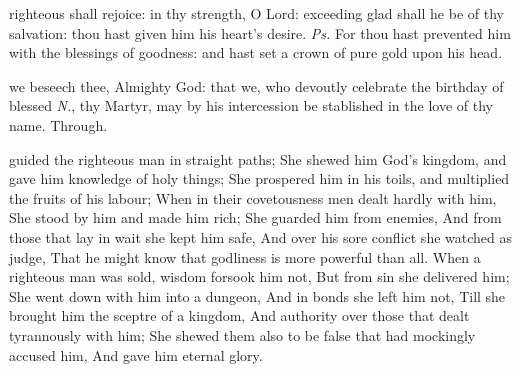 \introit
{} righteous shall rejoice: in thy strength, O Lord: exceeding glad shall he be of thy salvation: thou hast given him his heart's desire. \textit{Ps.} For thou hast prevented him with the blessings of goodness: and hast set a crown of pure gold upon his head.

\collect\label{CommonMartyrNotBishopICollect}
 we beseech thee, Almighty God: that we, who devoutly celebrate the birthday of blessed \textit{N.}, thy Martyr, may by his intercession be stablished in the love of thy name. Through.

 guided the righteous man in straight paths; She shewed him God's kingdom, and gave him knowledge of holy things; She prospered him in his toils, and multiplied the fruits of his labour; When in their covetousness men dealt hardly with him, She stood by him and made him rich; She guarded him from enemies, And from those that lay in wait she kept him safe, And over his sore conflict she watched as judge, That he might know that godliness is more powerful than all. When a righteous man was sold, wisdom forsook him not, But from sin she delivered him; She went down with him into a dungeon, And in bonds she left him not, Till she brought him the sceptre of a kingdom, And authority over those that dealt tyrannously with him; She shewed them also to be false that had mockingly accused him, And gave him eternal glory. 



